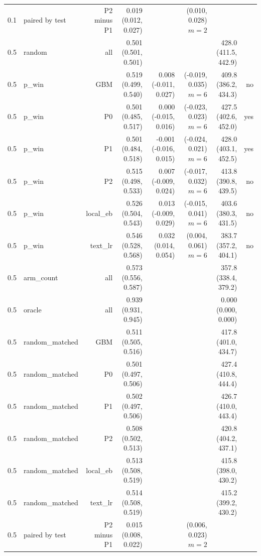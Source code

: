 \begin{tabular}{llrrrrrr}
0.1 & paired by test & P2 minus P1 & 0.019 (0.012, 0.027) &  & (0.010, 0.028) $m=2$ &  &  \\
0.5 & random & all & 0.501 (0.501, 0.501) &  &  & 428.0 (411.5, 442.9) &  \\
0.5 & p\_win & GBM & 0.519 (0.499, 0.540) & 0.008 (-0.011, 0.027) & (-0.019, 0.035) $m=6$ & 409.8 (386.2, 434.3) & no \\
0.5 & p\_win & P0 & 0.501 (0.485, 0.517) & 0.000 (-0.015, 0.016) & (-0.023, 0.023) $m=6$ & 427.5 (402.6, 452.0) & yes \\
0.5 & p\_win & P1 & 0.501 (0.484, 0.518) & -0.001 (-0.016, 0.015) & (-0.024, 0.021) $m=6$ & 428.0 (403.1, 452.5) & yes \\
0.5 & p\_win & P2 & 0.515 (0.498, 0.533) & 0.007 (-0.009, 0.024) & (-0.017, 0.032) $m=6$ & 413.8 (390.8, 439.5) & no \\
0.5 & p\_win & local\_eb & 0.526 (0.504, 0.543) & 0.013 (-0.009, 0.029) & (-0.015, 0.041) $m=6$ & 403.6 (380.3, 431.5) & no \\
0.5 & p\_win & text\_lr & 0.546 (0.528, 0.568) & 0.032 (0.014, 0.054) & (0.004, 0.061) $m=6$ & 383.7 (357.2, 404.1) & no \\
0.5 & arm\_count & all & 0.573 (0.556, 0.587) &  &  & 357.8 (338.4, 379.2) &  \\
0.5 & oracle & all & 0.939 (0.931, 0.945) &  &  & 0.000 (0.000, 0.000) &  \\
0.5 & random\_matched & GBM & 0.511 (0.505, 0.516) &  &  & 417.8 (401.0, 434.7) &  \\
0.5 & random\_matched & P0 & 0.501 (0.497, 0.506) &  &  & 427.4 (410.8, 444.4) &  \\
0.5 & random\_matched & P1 & 0.502 (0.497, 0.506) &  &  & 426.7 (410.0, 443.4) &  \\
0.5 & random\_matched & P2 & 0.508 (0.502, 0.513) &  &  & 420.8 (404.2, 437.1) &  \\
0.5 & random\_matched & local\_eb & 0.513 (0.508, 0.519) &  &  & 415.8 (398.0, 430.2) &  \\
0.5 & random\_matched & text\_lr & 0.514 (0.508, 0.519) &  &  & 415.2 (399.2, 430.2) &  \\
0.5 & paired by test & P2 minus P1 & 0.015 (0.008, 0.022) &  & (0.006, 0.023) $m=2$ &  &  \\
\bottomrule
\end{tabular}
